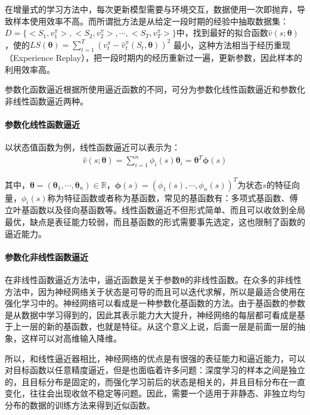 在增量式的学习方法中，每次更新模型需要与环境交互，数据使用一次即抛弃，导致样本使用效率不高。而所谓批方法是从给定一段时期的经验中抽取数据集：$D=\{<S_{1},v^{\pi}_{1}>,<S_{2},v^{\pi}_{2}>,\cdots,<S_{T},v^{\pi}_{T}>\}$中，找到最好的拟合函数$\hat{v}(s;\bm{\theta})$，使的$LS(\bm{\theta})=\sum_{t=1}^{T}(v^{\pi}_{t}-\hat{v}^{\pi}_{t}(S_{t},\bm{\theta}))^2$ 最小，这种方法相当于经历重现（Experience Replay），把一段时期内的经历重新过一遍，更新参数，因此样本的利用效率高。

参数化函数逼近根据所使用逼近函数的不同，可分为参数化线性函数逼近和参数化非线性函数逼近两种。

\paragraph{参数化线性函数逼近}

以状态值函数为例，线性函数逼近可以表示为：
\begin{equation}
\begin{aligned}
\hat{v}(s;\bm{\theta})=\sum^{n}_{i=1}\phi_{i}(s) \bm{\theta}_{i}=\bm{\theta }^{T} \bm{\phi}(s)
\end{aligned}
\end{equation}

其中，$\bm{\theta}=(\bm{\theta}_{1},\cdots,\bm{\theta}_{n}) \in \mathbb{R}$，$\bm{\phi}(s)=(\phi_{1}(s),\cdots,\phi_{n}(s))^{T}$为状态$s$的特征向量，$\phi_{i}(s)$称为特征函数或者称为基函数，常见的基函数有：多项式基函数、傅立叶基函数以及径向基函数等。线性函数逼近不但形式简单、而且可以收敛到全局最优，缺点是表征能力较弱，而且基函数的形式需要事先选定，这也限制了函数的逼近能力。


\paragraph{参数化非线性函数逼近}
在非线性函数逼近方法中，逼近函数是关于参数$\bm{\theta}$的非线性函数。在众多的非线性方法中，因为神经网络关于状态是可导的而且可以迭代求解，所以是最适合使用在强化学习中的。神经网络可以看成是一种参数化基函数的方法。由于基函数的参数是从数据中学习得到的，因此其表示能力大大提升，神经网络的每层都可看成是基于上一层的新的基函数，也就是特征。从这个意义上说，后面一层是前面一层的抽象，这样可以对高维输入降维。

所以，和线性逼近器相比，神经网络的优点是有很强的表征能力和逼近能力，可以对目标函数以任意精度逼近，但是也面临着许多问题：深度学习的样本之间是独立的，且目标分布是固定的，而强化学习前后的状态是相关的，并且目标分布在一直变化，往往会出现收敛不稳定等问题。因此，需要一个适用于非静态、非独立均匀分布的数据的训练方法来得到近似函数。

